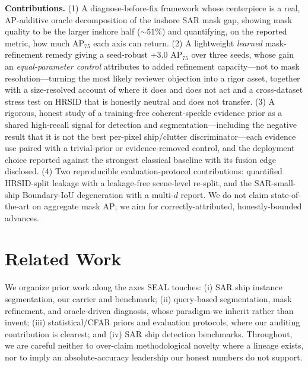 \noindent\textbf{Contributions.} (1) A diagnose-before-fix framework whose centerpiece is a real, AP-additive oracle decomposition of the inshore SAR mask gap, showing mask quality to be the larger inshore half ($\sim\!51\%$) and quantifying, on the reported metric, how much AP$_{75}$ each axis can return. (2) A lightweight \emph{learned} mask-refinement remedy giving a seed-robust $+3.0$ AP$_{75}$ over three seeds, whose gain an \emph{equal-parameter control} attributes to added refinement capacity---not to mask resolution---turning the most likely reviewer objection into a rigor asset, together with a size-resolved account of where it does and does not act and a cross-dataset stress test on HRSID that is honestly neutral and does not transfer. (3) A rigorous, honest study of a training-free coherent-speckle evidence prior as a shared high-recall signal for detection and segmentation---including the negative result that it is not the best per-pixel ship/clutter discriminator---each evidence use paired with a trivial-prior or evidence-removed control, and the deployment choice reported against the strongest classical baseline with its fusion edge disclosed. (4) Two reproducible evaluation-protocol contributions: quantified HRSID-split leakage with a leakage-free scene-level re-split, and the SAR-small-ship Boundary-IoU degeneration with a multi-$d$ report. We do not claim state-of-the-art on aggregate mask AP; we aim for correctly-attributed, honestly-bounded advances.

\section{Related Work}
\label{sec:related}
We organize prior work along the axes SEAL touches: (i) SAR ship instance segmentation, our carrier and benchmark; (ii) query-based segmentation, mask refinement, and oracle-driven diagnosis, whose paradigm we inherit rather than invent; (iii) statistical/CFAR priors and evaluation protocols, where our auditing contribution is clearest; and (iv) SAR ship detection benchmarks. Throughout, we are careful neither to over-claim methodological novelty where a lineage exists, nor to imply an absolute-accuracy leadership our honest numbers do not support.

